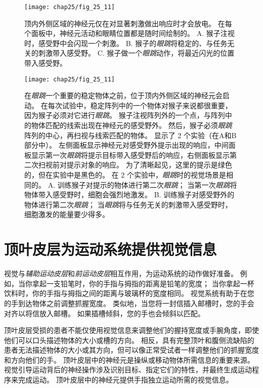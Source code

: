 \begin{figure}[htbp]
	\centering
	\texttt{[image: chap25/fig\_25\_11]}
	\caption{顶内外侧区域的神经元仅在对显著刺激做出响应时才会放电。
		在每个面板中，神经元活动和眼睛位置都是随时间绘制的。
		A. 猴子注视时，感受野中会闪现一个刺激。
		B. 猴子的\textit{眼跳}将稳定的、与任务无关的刺激带入感受野。
		C. 猴子做一个\textit{眼跳}动作，将最近闪光的位置带入感受野。}
	\label{fig:25_11}
\end{figure}


\begin{figure}[htbp]
	\centering
	\texttt{[image: chap25/fig\_25\_11]}
	\caption{在\textit{眼跳}一个重要的稳定物体之前，位于顶内外侧区域的神经元会启动。
		在每次试验中，稳定阵列中的一个物体对猴子来说都很重要，因为猴子必须对它进行\textit{眼跳}。
		猴子注视阵列外的一个点，与阵列中的物体匹配的线索出现在神经元的感受野外。
		然后，猴子必须\textit{眼跳}阵列的中心，再扫视与线索匹配的物体。
		显示了 2 个实验（在A和B部分中）。
		左侧面板显示神经元对感受野外提示出现的响应，中间面板显示第一次\textit{眼跳}将提示目标带入感受野后的响应，右侧面板显示第二次扫视前对提示对象的响应。
		为了清晰起见，这里的提示是绿色的，但在实验中是黑色的。
		在 2 个实验中，\textit{眼跳}时的视觉场景是相同的。
		A. 训练猴子对提示的物体进行第二次\textit{眼跳}；
		当第一次\textit{眼跳}将物体带入感受野时，细胞会强烈地激发。
		B. 训练猴子对感受野外的物体进行第二次\textit{眼跳}；
		当\textit{眼跳}将与任务无关的刺激带入感受野时，细胞激发的能量要少得多。}
	\label{fig:25_12}
\end{figure}



\section{顶叶皮层为运动系统提供视觉信息}

视觉与\textit{辅助运动皮层}和\textit{前运动皮层}相互作用，为运动系统的动作做好准备。
例如，当你拿起一支铅笔时，你的手指与拇指的距离是铅笔的宽度；
当你拿起一杯饮料时，你的手指与拇指之间的距离与玻璃杯的宽度相同。
视觉系统有助于在您的手到达物体之前调整抓握宽度。
类似地，当您将一封信插入邮槽时，您的手会对齐以将信放入邮槽。
如果插槽倾斜，您的手也会倾斜以匹配。


顶叶皮层受损的患者不能仅使用视觉信息来调整他们的握持宽度或手腕角度，即使他们可以口头描述物体的大小或槽的方向。
相反，具有完整顶叶和腹侧流缺陷的患者无法描述物体的大小或其方向，但可以像正常受试者一样调整他们的抓握宽度和方向他们的手。
顶叶皮层中的神经元是操纵或移动物体所需信息的重要来源。
视觉引导运动背后的神经操作涉及识别目标、指定它们的特性，并最终生成运动程序来完成运动。
顶叶皮层中的神经元提供手指独立运动所需的视觉信息。


